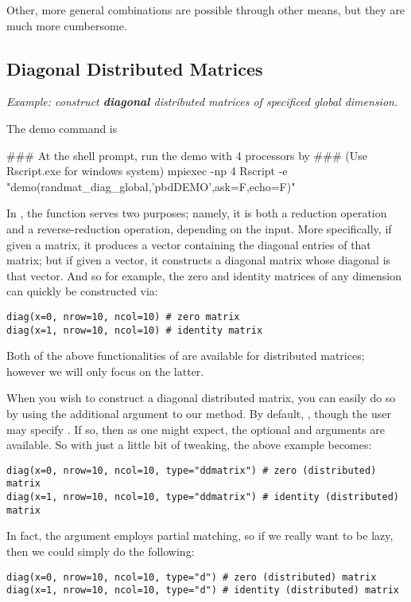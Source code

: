 Other, more general combinations are possible through other means, but they are much more cumbersome.




\subsection{Diagonal Distributed Matrices}\label{sub:diag}

\emph{Example:  construct \textbf{diagonal} distributed matrices of specificed global dimension.}

The demo command is
\begin{Command}
### At the shell prompt, run the demo with 4 processors by
### (Use Rscript.exe for windows system)
mpiexec -np 4 Rscript -e "demo(randmat_diag_global,'pbdDEMO',ask=F,echo=F)"
\end{Command}

In , the  function serves two purposes; namely, it is both a reduction operation and a reverse-reduction operation, depending on the input.  More specifically, if given a matrix, it produces a vector containing the diagonal entries of that matrix; but if given a vector, it constructs a diagonal matrix whose diagonal is that vector.  And so for example, the zero and identity matrices of any dimension can quickly be constructed via:
\begin{lstlisting}[language=rr,title=Diagonal Matrices in R]
diag(x=0, nrow=10, ncol=10) # zero matrix
diag(x=1, nrow=10, ncol=10) # identity matrix
\end{lstlisting}

Both of the above functionalities of  are available for distributed matrices; however we will only focus on the latter. 

When you wish to construct a diagonal distributed matrix, you can easily do so by using the additional  argument to our  method.  By default, , though the user may specify .  If so, then as one might expect, the optional  and  arguments are available.  So with just a little bit of tweaking, the above example becomes:
\begin{lstlisting}[language=rr,title=Diagonal Matrices in pbdR]
diag(x=0, nrow=10, ncol=10, type="ddmatrix") # zero (distributed) matrix
diag(x=1, nrow=10, ncol=10, type="ddmatrix") # identity (distributed) matrix
\end{lstlisting}
In fact, the  argument employs partial matching, so if we really want to be lazy, then we could simply do the following:
\begin{lstlisting}[language=rr,title=Diagonal Matrices in pbdR]
diag(x=0, nrow=10, ncol=10, type="d") # zero (distributed) matrix
diag(x=1, nrow=10, ncol=10, type="d") # identity (distributed) matrix
\end{lstlisting}


